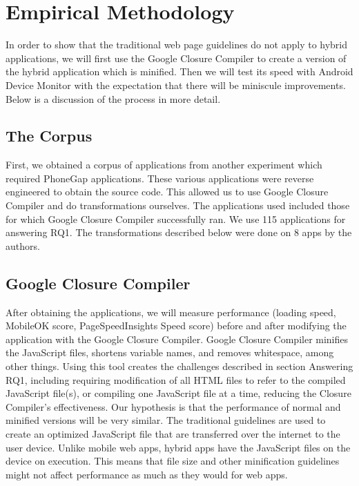 \documentclass{acm_proc_article-sp}
\begin{document}
\section{Empirical Methodology}
In order to show that the traditional web page guidelines do not apply to hybrid applications, we will first use the Google Closure Compiler to create a version of the hybrid application which is minified.
Then we will test its speed with Android Device Monitor with the expectation that there will be miniscule improvements.
Below is a discussion of the process in more detail.

\subsection{The Corpus}
First, we obtained a corpus of applications from another experiment which required PhoneGap applications. 
These various applications were reverse engineered to obtain the source code. 
This allowed us to use Google Closure Compiler and do transformations ourselves.
The applications used included those for which Google Closure Compiler successfully ran. 
We use 115 applications for answering RQ1.
The transformations described below were done on 8 apps by the authors.

\subsection{Google Closure Compiler}
After obtaining the applications, we will measure performance (loading speed, MobileOK score, PageSpeedInsights Speed score) before and after modifying the application with the Google Closure Compiler. 
Google Closure Compiler minifies the JavaScript files, shortens variable names, and removes whitespace, among other things. 
Using this tool creates the challenges described in section Answering RQ1, including requiring modification of all HTML files to refer to the compiled JavaScript file(s), or compiling one JavaScript file at a time, reducing the Closure Compiler's effectiveness. 
Our hypothesis is that the performance of normal and minified versions will be very similar.
The traditional guidelines are used to create an optimized JavaScript file that are transferred over the internet to the user device.
Unlike mobile web apps, hybrid apps have the JavaScript files on the device on execution.
This means that file size and other minification guidelines might not affect performance as much as they would for web apps.
\end{document}
